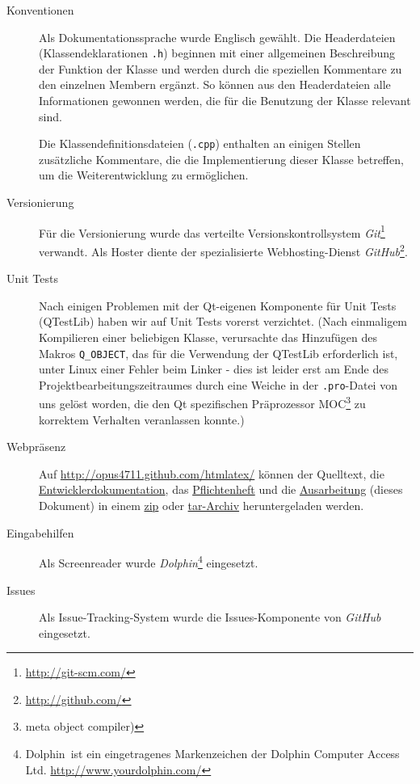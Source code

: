 \documentclass[	a4paper,		%
		titlepage, 		%
		fontsize=12pt		%
		]{scrartcl} 		%
\begin{document}
\begin{description}
\item[Konventionen]
Als Dokumentationssprache wurde Englisch gewählt. Die Headerdateien (Klassendeklarationen \texttt{.h}) beginnen mit einer allgemeinen Beschreibung der Funktion der Klasse und werden durch die speziellen Kommentare zu den einzelnen Membern ergänzt. So können aus den Headerdateien alle Informationen gewonnen werden, die für die Benutzung der Klasse relevant sind.

Die Klassendefinitionsdateien (\texttt{.cpp}) enthalten an einigen Stellen zusätzliche Kommentare, die die Implementierung dieser Klasse betreffen, um die Weiterentwicklung zu ermöglichen.

 \item[Versionierung]
Für die Versionierung wurde das verteilte Versionskontrollsystem \emph{Git}\footnote{\href{http://git-scm.com/}{http://git-scm.com/}} verwandt. Als Hoster diente der spezialisierte Webhosting-Dienst \emph{GitHub}\footnote{\href{http://github.com/}{http://github.com/}}.

\item[Unit Tests]
Nach einigen Problemen mit der Qt-eigenen Komponente für Unit Tests (QTestLib) haben wir auf Unit Tests vorerst verzichtet. (Nach einmaligem Kompilieren einer beliebigen Klasse, verursachte das Hinzufügen des Makros \texttt{Q\_OBJECT}, das für die Verwendung der QTestLib erforderlich ist, unter Linux einer Fehler beim Linker - dies ist leider erst am Ende des Projektbearbeitungszeitraumes durch eine Weiche in der \texttt{.pro}-Datei von uns gelöst worden, die den Qt spezifischen Präprozessor MOC\footnote{meta object compiler)} zu korrektem Verhalten veranlassen konnte.)

 \item[Webpräsenz]
Auf \href{http://opus4711.github.com/htmlatex/}{http://opus4711.github.com/htmlatex/} können der Quelltext, die \href{http://opus4711.github.com/htmlatex/documentation/html/index.html}{Entwicklerdokumentation}, das \href{http://opus4711.github.com/htmlatex/Pflichtenheft/pflichtenheft.pdf}{Pflichtenheft} und die \href{http://opus4711.github.com/htmlatex/Ausarbeitung/ausarbeitung.pdf}{Ausarbeitung} (dieses Dokument) in einem \href{http://github.com/opus4711/htmlatex/zipball/master}{zip} oder \href{http://github.com/opus4711/htmlatex/tarball/master}{tar-Archiv} heruntergeladen werden.

 \item[Eingabehilfen]
 Als Screenreader wurde \emph{Dolphin}\footnote{Dolphin\textregistered ~ist ein eingetragenes Markenzeichen der Dolphin Computer Access Ltd. \newline \href{http://www.yourdolphin.com/}{http://www.yourdolphin.com/}} eingesetzt.

  \item[Issues]
Als Issue-Tracking-System wurde die Issues-Komponente von \emph{GitHub} eingesetzt.

 \end{description}
\end{document}
